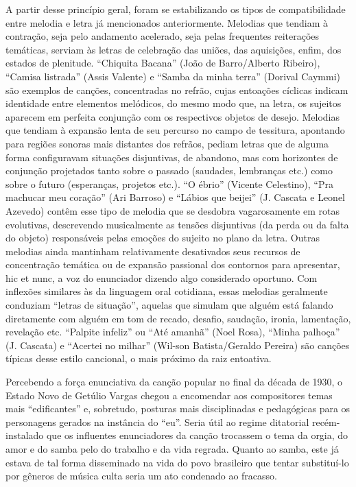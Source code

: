 A partir desse princípio geral, foram se estabilizando os tipos de
compatibilidade entre melodia e letra já mencionados anteriormente.
Melodias que tendiam à contração, seja pelo andamento acelerado, seja
pelas frequentes reiterações temáticas, serviam às letras de celebração
das uniões, das aquisições, enfim, dos estados de plenitude. ``Chiquita
Bacana'' (João de Barro/Alberto Ribeiro), ``Camisa listrada'' (Assis
Valente) e ``Samba da minha terra'' (Dorival Caymmi) são exemplos de
canções, concentradas no refrão, cujas entoações cíclicas indicam
identidade entre elementos melódicos, do mesmo modo que, na letra, os
sujeitos aparecem em perfeita conjunção com os respectivos objetos de
desejo. Melodias que tendiam à expansão lenta de seu percurso no campo
de tessitura, apontando para regiões sonoras mais distantes dos refrãos,
pediam letras que de alguma forma configuravam situações disjuntivas, de
abandono, mas com horizontes de conjunção projetados tanto sobre o
passado (saudades, lembranças etc.) como sobre o futuro (esperanças,
projetos etc.). ``O ébrio'' (Vicente Celestino), ``Pra machucar meu
coração'' (Ari Barroso) e ``Lábios que beijei'' (J. Cascata e Leonel
Azevedo) contêm esse tipo de melodia que se desdobra vagarosamente em
rotas evolutivas, descrevendo musicalmente as tensões disjuntivas (da
perda ou da falta do objeto) responsáveis pelas emoções do sujeito no
plano da letra. Outras melodias ainda mantinham relativamente
desativados seus recursos de concentração temática ou de expansão
passional dos contornos para apresentar, hic et nunc, a voz do
enunciador dizendo algo considerado oportuno. Com inflexões similares às
da linguagem oral cotidiana, essas melodias geralmente conduziam
``letras de situação'', aquelas que simulam que alguém está falando
diretamente com alguém em tom de recado, desafio, saudação, ironia,
lamentação, revelação etc. ``Palpite infeliz'' ou ``Até amanhã'' (Noel
Rosa), ``Minha palhoça'' (J. Cascata) e ``Acertei no milhar'' (Wil-son
Batista/Geraldo Pereira) são canções típicas desse estilo cancional, o
mais próximo da raiz entoativa.~

Percebendo a força enunciativa da canção popular no final da década de
1930, o Estado Novo de Getúlio Vargas chegou a encomendar aos
compositores temas mais ``edificantes'' e, sobretudo, posturas mais
disciplinadas e pedagógicas para os personagens gerados na instância do
``eu''. Seria útil ao regime ditatorial recém-instalado que os
influentes enunciadores da canção trocassem o tema da orgia, do amor e
do samba pelo do trabalho e da vida regrada. Quanto ao samba, este já
estava de tal forma disseminado na vida do povo brasileiro que tentar
substituí-lo por gêneros de música culta seria um ato condenado ao
fracasso.

